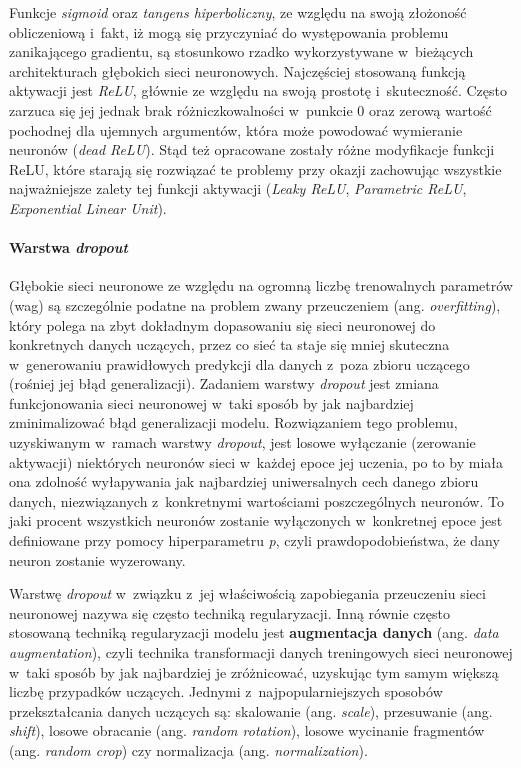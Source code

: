 Funkcje \emph{sigmoid} oraz \emph{tangens hiperboliczny}, ze względu na swoją złożoność obliczeniową i~fakt, iż mogą się przyczyniać do występowania problemu zanikającego gradientu, są stosunkowo rzadko wykorzystywane w~bieżących architekturach głębokich sieci neuronowych. Najczęściej stosowaną funkcją aktywacji jest \emph{ReLU}, głównie ze względu na swoją prostotę i~skuteczność. Często zarzuca się jej jednak brak różniczkowalności w~punkcie 0 oraz zerową wartość pochodnej dla ujemnych argumentów, która może powodować wymieranie neuronów (\emph{dead ReLU}). Stąd też opracowane zostały różne modyfikacje funkcji ReLU, które starają się rozwiązać te problemy przy okazji zachowując wszystkie najważniejsze zalety tej funkcji aktywacji (\emph{Leaky ReLU}, \emph{Parametric ReLU}, \emph{Exponential Linear Unit}).

\paragraph*{Warstwa \emph{dropout}}

Głębokie sieci neuronowe ze względu na ogromną liczbę trenowalnych parametrów (wag) są szczególnie podatne na problem zwany przeuczeniem (ang. \emph{overfitting}), który polega na zbyt dokładnym dopasowaniu się sieci neuronowej do konkretnych danych uczących, przez co sieć ta staje się mniej skuteczna w~generowaniu prawidłowych predykcji dla danych z~poza zbioru uczącego (rośniej jej błąd generalizacji). Zadaniem warstwy \emph{dropout} jest zmiana funkcjonowania sieci neuronowej w~taki sposób by jak najbardziej zminimalizować błąd generalizacji modelu. Rozwiązaniem tego problemu, uzyskiwanym w~ramach warstwy \emph{dropout}, jest losowe wyłączanie (zerowanie aktywacji) niektórych neuronów sieci w~każdej epoce jej uczenia, po to by miała ona zdolność wyłapywania jak najbardziej uniwersalnych cech danego zbioru danych, niezwiązanych z~konkretnymi wartościami poszczególnych neuronów. To jaki procent wszystkich neuronów zostanie wyłączonych w~konkretnej epoce jest definiowane przy pomocy hiperparametru \emph{p}, czyli prawdopodobieństwa, że dany neuron zostanie wyzerowany. 

Warstwę \emph{dropout} w~związku z~jej właściwością zapobiegania przeuczeniu sieci neuronowej nazywa się często techniką regularyzacji. Inną równie często stosowaną techniką regularyzacji modelu jest \textbf{augmentacja danych} (ang. \emph{data augmentation}), czyli technika transformacji danych treningowych sieci neuronowej w~taki sposób by jak najbardziej je zróżnicować, uzyskując tym samym większą liczbę przypadków uczących. Jednymi z~najpopularniejszych sposobów przekształcania danych uczących są: skalowanie (ang. \emph{scale}), przesuwanie (ang. \emph{shift}), losowe obracanie (ang. \emph{random rotation}), losowe wycinanie fragmentów (ang. \emph{random crop}) czy normalizacja (ang. \emph{normalization}). 

